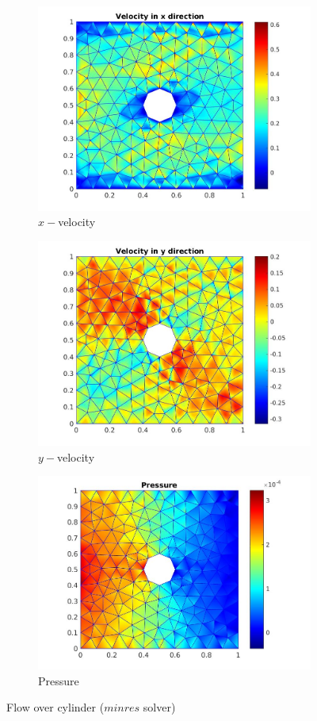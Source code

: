 \documentclass[a4paper,twoside,openright]{book}
\begin{document}
\begin{figure}
\begin{subfigure}{\textwidth}	
  \includegraphics[width=0.8\linewidth]{cylinder_minres_vx.jpg}
    \caption{$x-$velocity}
    \label{x_vel_stoke_minres}
\end{subfigure}
\begin{subfigure}{\textwidth}	
    \includegraphics[width=0.8\linewidth]{cylinder_minres_vy.jpg}
    \caption{$y-$velocity}
     \label{y_vel_stoke_minres}
\end{subfigure}
\begin{subfigure}{\textwidth}	
    \includegraphics[width=0.8\linewidth]{cylinder_minres_pressure.jpg}
    \caption{Pressure}
      \label{pressure_stoke_minres}
\end{subfigure}
\caption{Flow over cylinder ($minres$ solver)}
\label{flow_over_cylinder_minres}
\end{figure}
\end{document}
